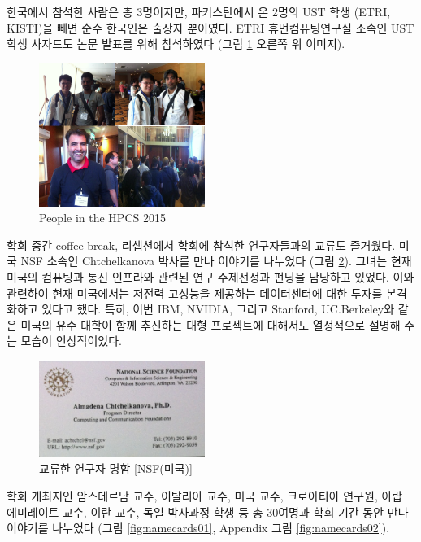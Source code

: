 \documentclass[twocolumn]{article}
\begin{document}
한국에서 참석한 사람은 총 3명이지만, 파키스탄에서 온 2명의 UST 학생 (ETRI, KISTI)을 빼면 순수 한국인은 출장자 뿐이였다. ETRI 휴먼컴퓨팅연구실 소속인 UST 학생 사자드도 논문 발표를 위해 참석하였다 (그림 \ref{fig:people} 오른쪽 위 이미지).

\begin{figure}[htb]
        \centering
        \includegraphics[width=0.48\textwidth]{people.png}
        \caption{People in the HPCS 2015}
        \label{fig:people}
\end{figure}

학회 중간 coffee break, 리셉션에서 학회에 참석한 연구자들과의 교류도 즐거웠다. 미국 NSF 소속인 Chtchelkanova 박사를 만나 이야기를 나누었다 (그림 \ref{fig:namecards00}). 그녀는 현재 미국의 컴퓨팅과 통신 인프라와 관련된 연구 주제선정과 펀딩을 담당하고 있었다. 이와 관련하여 현재 미국에서는 저전력 고성능을 제공하는 데이터센터에 대한 투자를 본격화하고 있다고 했다. 특히, 이번 IBM, NVIDIA, 그리고 Stanford, UC.Berkeley와 같은 미국의 유수 대학이 함께 추진하는 대형 프로젝트에 대해서도 열정적으로 설명해 주는 모습이 인상적이었다.
\begin{figure}[htb]
        \centering
        \includegraphics[width=0.48\textwidth]{nc01.png}
        \caption{교류한 연구자 명함 [NSF(미국)]}
        \label{fig:namecards00}
\end{figure}

학회 개최지인 암스테르담 교수, 이탈리아 교수, 미국 교수, 크로아티아 연구원, 아랍 에미레이트 교수, 이란 교수, 독일 박사과정 학생 등 총 30여명과 학회 기간 동안 만나 이야기를 나누었다 (그림 \ref{fig:namecards01}, Appendix 그림 \ref{fig:namecards02}).
\end{document}
